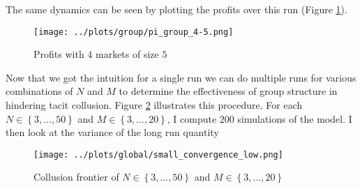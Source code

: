 \documentclass[american]{scrartcl}
\newcommand{\set}[1]{\left\{#1\right\}}
\begin{document}
The same dynamics can be seen by plotting the profits over this run (Figure \ref{fig:small_avg_profit}).

\begin{figure}[h!]
    \center
    \texttt{[image: ../plots/group/pi\_group\_4-5.png]}
    \caption{Profits with $4$ markets of size $5$}
    \label{fig:small_avg_profit}
\end{figure}


Now that we got the intuition for a single run we can do multiple runs for various combinations of $N$ and $M$ to determine the effectiveness of group structure in hindering tacit collusion. Figure \ref{fig:frontier} illustrates this procedure. For each $N \in \set{3, \ldots, 50}$ and $M \in \set{3, \ldots, 20}$, I compute $200$ simulations of the model. I then look at the variance of the long run quantity

\begin{figure}[h!]
    \center
    \texttt{[image: ../plots/global/small\_convergence\_low.png]}
    \caption{Collusion frontier of $N \in \set{3, \ldots, 50}$ and $M \in \set{3, \ldots, 20}$ }
    \label{fig:frontier}
\end{figure}


\newpage
\nocite{*}
\printbibliography
\end{document}
